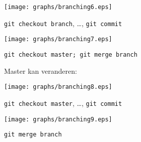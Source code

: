 \begin{frame}
	\begin{center}
		\texttt{[image: graphs/branching6.eps]}
	\end{center}
	\texttt{git checkout branch}, \ldots, \texttt{git commit}
\end{frame}

\begin{frame}
	\begin{center}
		\texttt{[image: graphs/branching7.eps]}
	\end{center}
	\texttt{git checkout master; git merge branch}
\end{frame}

\begin{frame}
	Master kan veranderen:
	\begin{center}
		\texttt{[image: graphs/branching8.eps]}
	\end{center}
	\texttt{git checkout master}, \ldots, \texttt{git commit}
\end{frame}

\begin{frame}
	\begin{center}
		\texttt{[image: graphs/branching9.eps]}
	\end{center}
	\texttt{git merge branch}
\end{frame}




